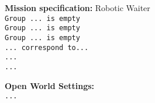 \begin{algorithm}
	\textbf{Mission specification:} Robotic Waiter\\
	{\small
	\texttt{Group ... is empty}\\
	\texttt{Group ... is empty}\\
	\texttt{Group ... is empty}\\
	
	\texttt{... correspond to...}\\
	
	\texttt{...}\\
	
	\texttt{...}\\
	}
	
	\textbf{Open World Settings:}\\
	{\small
	\texttt{...} 
	}
\end{algorithm}


